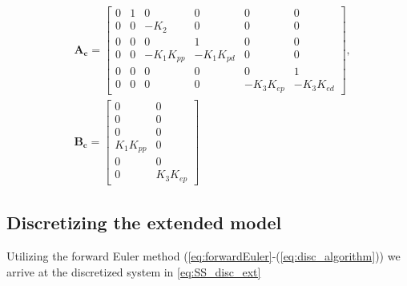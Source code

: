 \begin{equation}\label{eq:SS_cont_ext}
    \begin{aligned}
        &\mathbf{A_c} =
        \begin{bmatrix} 
          0 & 1 &     0      &     0      &     0      &     0 \\
          0 & 0 &   -K_2     &     0      &     0      &     0 \\ 
          0 & 0 &     0      &     1      &     0      &     0 \\ 
          0 & 0 & -K_1K_{pp} & -K_1K_{pd} &     0      &     0 \\
          0 & 0 &     0      &     0      &     0      &     1 \\
          0 & 0 &     0      &     0      & -K_3K_{ep} & -K_3K_{ed}
          \end{bmatrix}, \\
        &\mathbf{B_c} = 
        \begin{bmatrix}
           0      &    0 \\
           0      &    0 \\
           0      &    0 \\ 
        K_1K_{pp} &    0 \\
           0      &    0 \\
           0      & K_3K_{ep}
        \end{bmatrix}
    \end{aligned}
\end{equation}

\subsection{Discretizing the extended model}\label{sec:ex4.2}

Utilizing the forward Euler method (\cref{eq:forwardEuler}-(\ref{eq:disc_algorithm})) we arrive at the discretized system in \cref{eq:SS_disc_ext}

